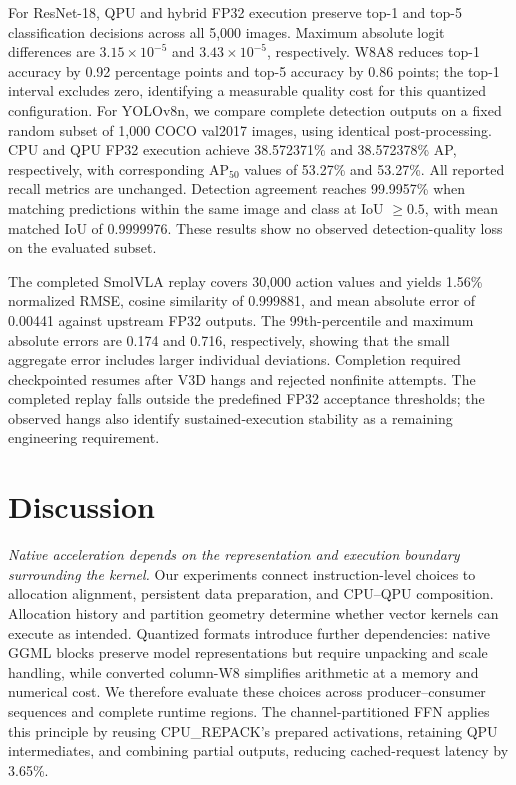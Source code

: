 \documentclass[sigplan,screen,review]{acmart}
\begin{document}
For ResNet-18, QPU and hybrid FP32 execution preserve top-1 and top-5 classification decisions across all 5,000 images. Maximum absolute logit differences are $3.15\times10^{-5}$ and $3.43\times10^{-5}$, respectively. W8A8 reduces top-1 accuracy by 0.92 percentage points and top-5 accuracy by 0.86 points; the top-1 interval excludes zero, identifying a measurable quality cost for this quantized configuration. For YOLOv8n, we compare complete detection outputs on a fixed random subset of 1,000 COCO val2017 images, using identical post-processing. CPU and QPU FP32 execution achieve 38.572371\% and 38.572378\% AP, respectively, with corresponding AP$_{50}$ values of 53.27\% and 53.27\%. All reported recall metrics are unchanged. Detection agreement reaches 99.9957\% when matching predictions within the same image and class at IoU $\geq0.5$, with mean matched IoU of 0.9999976. These results show no observed detection-quality loss on the evaluated subset.

The completed SmolVLA replay covers 30,000 action values and yields 1.56\% normalized RMSE, cosine similarity of 0.999881, and mean absolute error of 0.00441 against upstream FP32 outputs. The 99th-percentile and maximum absolute errors are 0.174 and 0.716, respectively, showing that the small aggregate error includes larger individual deviations. Completion required checkpointed resumes after V3D hangs and rejected nonfinite attempts. The completed replay falls outside the predefined FP32 acceptance thresholds; the observed hangs also identify sustained-execution stability as a remaining engineering requirement.


\section{Discussion}
\label{sec:discussion}

\textit{Native acceleration depends on the representation and execution boundary surrounding the kernel.} Our experiments connect instruction-level choices to allocation alignment, persistent data preparation, and CPU--QPU composition. Allocation history and partition geometry determine whether vector kernels can execute as intended. Quantized formats introduce further dependencies: native GGML blocks preserve model representations but require unpacking and scale handling, while converted column-W8 simplifies arithmetic at a memory and numerical cost. We therefore evaluate these choices across producer--consumer sequences and complete runtime regions. The channel-partitioned FFN applies this principle by reusing CPU\_REPACK's prepared activations, retaining QPU intermediates, and combining partial outputs, reducing cached-request latency by 3.65\%.
\end{document}
